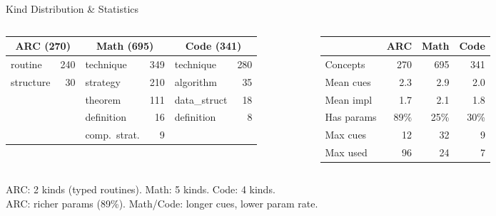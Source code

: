 \documentclass[10pt]{beamer}
\begin{document}
\begin{frame}{Kind Distribution \& Statistics}
  \begin{columns}[T]
    \begin{table}
      \tiny
      \begin{tabular}{@{} l r | l r | l r @{}}
        \toprule
        \multicolumn{2}{c|}{\textcolor{arcblue}{\textbf{ARC (270)}}}
        & \multicolumn{2}{c|}{\textcolor{mathgreen}{\textbf{Math (695)}}}
        & \multicolumn{2}{c}{\textcolor{codeorange}{\textbf{Code (341)}}} \\
        \midrule
        routine & 240 & technique & 349 & technique & 280 \\
        structure & 30 & strategy & 210 & algorithm & 35 \\
         & & theorem & 111 & data\_struct & 18 \\
         & & definition & 16 & definition & 8 \\
         & & comp.~strat. & 9 & & \\
        \bottomrule
      \end{tabular}
    \end{table}

    \begin{table}
      \tiny
      \begin{tabular}{@{} l rrr @{}}
        \toprule
        & ARC & Math & Code \\
        \midrule
        Concepts & 270 & 695 & 341 \\
        Mean cues & 2.3 & 2.9 & 2.0 \\
        Mean impl & 1.7 & 2.1 & 1.8 \\
        Has params & 89\% & 25\% & 30\% \\
        Max cues & 12 & 32 & 9 \\
        Max used & 96 & 24 & 7 \\
        \bottomrule
      \end{tabular}
    \end{table}
  \end{columns}

  \vspace{0.5em}
  {\footnotesize ARC: 2 kinds (typed routines). Math: 5 kinds. Code: 4 kinds.\\
  ARC: richer params (89\%). Math/Code: longer cues, lower param rate.}
\end{frame}
\end{document}
